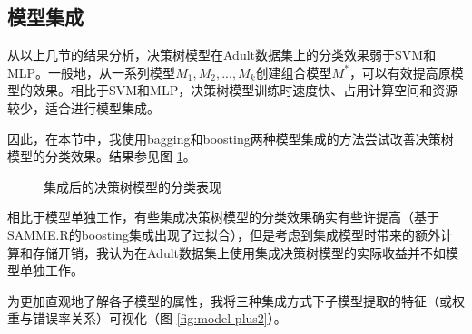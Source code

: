\documentclass[12pt,a4paper]{article}
\theoremstyle{definition}
\begin{document}
\subsection{模型集成}

从以上几节的结果分析，决策树模型在Adult数据集上的分类效果弱于SVM和MLP。一般地，从一系列模型$M_1, M_2, ... , M_k$创建组合模型$M^*$，可以有效提高原模型的效果。相比于SVM和MLP，决策树模型训练时速度快、占用计算空间和资源较少，适合进行模型集成。

\vspace{0.01\linewidth}
因此，在本节中，我使用bagging和boosting两种模型集成的方法尝试改善决策树模型的分类效果。结果参见图 \ref{fig:model-plus}。

\begin{figure}[H]
	\centering
	\caption{集成后的决策树模型的分类表现}
	\label{fig:model-plus}
\end{figure}

相比于模型单独工作，有些集成决策树模型的分类效果确实有些许提高（基于SAMME.R的boosting集成出现了过拟合），但是考虑到集成模型时带来的额外计算和存储开销，我认为在Adult数据集上使用集成决策树模型的实际收益并不如模型单独工作。

\vspace{0.01\linewidth}
为更加直观地了解各子模型的属性，我将三种集成方式下子模型提取的特征（或权重与错误率关系）可视化（图 \ref{fig:model-plus2}）。
\end{document}
